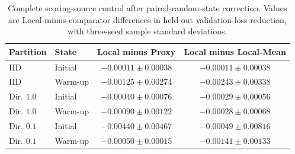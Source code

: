 \begin{table}[t]
\centering
\caption{Complete scoring-source control after paired-random-state correction. Values are Local-minus-comparator differences in held-out validation-loss reduction, with three-seed sample standard deviations.}
\label{tab:fm-source-control}
\small
\begin{tabular}{@{}llcc@{}}
\toprule
Partition & State & Local minus Proxy & Local minus Local-Mean \\
\midrule
IID & Initial & $-0.00011\pm0.00038$ & $-0.00011\pm0.00038$ \\
IID & Warm-up & $-0.00125\pm0.00274$ & $-0.00243\pm0.00338$ \\
Dir. $1.0$ & Initial & $-0.00040\pm0.00076$ & $-0.00029\pm0.00056$ \\
Dir. $1.0$ & Warm-up & $-0.00090\pm0.00122$ & $-0.00028\pm0.00068$ \\
Dir. $0.1$ & Initial & $-0.00440\pm0.00467$ & $-0.00049\pm0.00816$ \\
Dir. $0.1$ & Warm-up & $-0.00050\pm0.00015$ & $-0.00141\pm0.00133$ \\
\bottomrule
\end{tabular}
\end{table}
